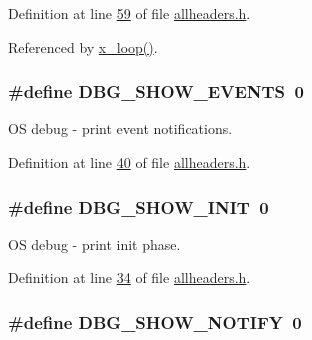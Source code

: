 Definition at line \hyperlink{a00040_source_l00059}{59} of file \hyperlink{a00040_source}{allheaders.\+h}.



Referenced by \hyperlink{a00037_source_l00231}{x\+\_\+loop()}.

\hypertarget{a00040_ac99a26a91700184ca9c836b8837fc9c2}{
\subsubsection[{D\+B\+G\+\_\+\+S\+H\+O\+W\+\_\+\+E\+V\+E\+N\+T\+S}]{\setlength{\rightskip}{0pt plus 5cm}\#define D\+B\+G\+\_\+\+S\+H\+O\+W\+\_\+\+E\+V\+E\+N\+T\+S~0}}\label{a00040_ac99a26a91700184ca9c836b8837fc9c2}


O\+S debug -\/ print event notifications. 



Definition at line \hyperlink{a00040_source_l00040}{40} of file \hyperlink{a00040_source}{allheaders.\+h}.

\hypertarget{a00040_a3f5985ec802de602e1ec6c5f35cf45ac}{
\subsubsection[{D\+B\+G\+\_\+\+S\+H\+O\+W\+\_\+\+I\+N\+I\+T}]{\setlength{\rightskip}{0pt plus 5cm}\#define D\+B\+G\+\_\+\+S\+H\+O\+W\+\_\+\+I\+N\+I\+T~0}}\label{a00040_a3f5985ec802de602e1ec6c5f35cf45ac}


O\+S debug -\/ print init phase. 



Definition at line \hyperlink{a00040_source_l00034}{34} of file \hyperlink{a00040_source}{allheaders.\+h}.

\hypertarget{a00040_aeba6fb01c031645d68a352c3e617724f}{
\subsubsection[{D\+B\+G\+\_\+\+S\+H\+O\+W\+\_\+\+N\+O\+T\+I\+F\+Y}]{\setlength{\rightskip}{0pt plus 5cm}\#define D\+B\+G\+\_\+\+S\+H\+O\+W\+\_\+\+N\+O\+T\+I\+F\+Y~0}}\label{a00040_aeba6fb01c031645d68a352c3e617724f}


